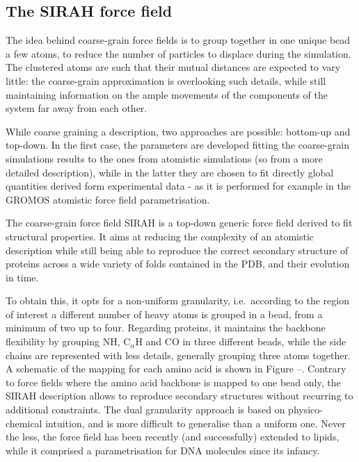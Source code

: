 \subsection{The SIRAH force field}
The idea behind coarse-grain force fields is to group together in one unique bead a few atoms, to reduce the number of particles to displace during the simulation. The clustered atoms are such that their mutual distances are expected to vary little: the coarse-grain approximation is overlooking such details, while still maintaining information on the ample movements of the components of the system far away from each other.

While coarse graining a description, two approaches are possible: bottom-up and top-down. In the first case, the parameters are developed fitting the coarse-grain simulations results to the ones from atomistic simulations (so from a more detailed description), while in the latter they are chosen to fit directly global quantities derived form experimental data - as it is performed for example in the GROMOS atomistic force field parametrisation.

The coarse-grain force field SIRAH \cite{--} is a top-down generic force field derived to fit structural properties. It aims at reducing the complexity of an atomistic description while still being able to reproduce the correct secondary structure of proteins across a wide variety of folds contained in the PDB, and their evolution in time.

To obtain this, it opts for a non-uniform granularity, i.e.\ according to the region of interest a different number of heavy atoms is grouped in a bead, from a minimum of two up to four. Regarding proteins, it maintains the backbone flexibility by grouping NH, C$_\alpha$H and CO in three different beads, while the side chains are represented with less details, generally grouping three atoms together. A schematic of the mapping for each amino acid is shown in Figure --. Contrary to force fields where the amino acid backbone is mapped to one bead only, the SIRAH description allows to reproduce secondary structures without recurring to additional constraints.
%
The dual granularity approach is based on physico-chemical intuition, and is more difficult to generalise than a uniform one. Never the less, the force field has been recently (and successfully) extended to lipids, while it comprised a parametrisation for DNA molecules since its infancy.

